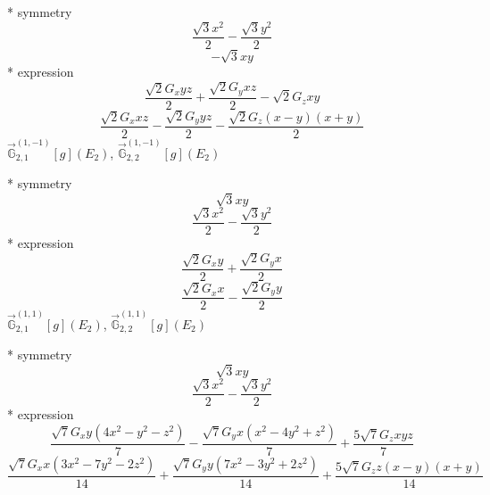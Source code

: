 \documentclass[fleqn,8pt]{jsarticle}
\begin{document}
\noindent\quad ** symmetry
\begin{dmath*}
\frac{\sqrt{3} x^{2}}{2} - \frac{\sqrt{3} y^{2}}{2}
\end{dmath*}
\begin{dmath*}
- \sqrt{3} x y
\end{dmath*}
\noindent\quad ** expression
\begin{dmath*}
\frac{\sqrt{2} G_{x} y z}{2} + \frac{\sqrt{2} G_{y} x z}{2} - \sqrt{2} G_{z} x y
\end{dmath*}
\begin{dmath*}
\frac{\sqrt{2} G_{x} x z}{2} - \frac{\sqrt{2} G_{y} y z}{2} - \frac{\sqrt{2} G_{z} \left(x - y\right) \left(x + y\right)}{2}
\end{dmath*}
\noindent\quad $\vec{\mathbb{G}}_{2,1}^{(1,-1)}[g](E_{2})$, $\vec{\mathbb{G}}_{2,2}^{(1,-1)}[g](E_{2})$

\noindent\quad ** symmetry
\begin{dmath*}
\sqrt{3} x y
\end{dmath*}
\begin{dmath*}
\frac{\sqrt{3} x^{2}}{2} - \frac{\sqrt{3} y^{2}}{2}
\end{dmath*}
\noindent\quad ** expression
\begin{dmath*}
\frac{\sqrt{2} G_{x} y}{2} + \frac{\sqrt{2} G_{y} x}{2}
\end{dmath*}
\begin{dmath*}
\frac{\sqrt{2} G_{x} x}{2} - \frac{\sqrt{2} G_{y} y}{2}
\end{dmath*}
\noindent\quad $\vec{\mathbb{G}}_{2,1}^{(1,1)}[g](E_{2})$, $\vec{\mathbb{G}}_{2,2}^{(1,1)}[g](E_{2})$

\noindent\quad ** symmetry
\begin{dmath*}
\sqrt{3} x y
\end{dmath*}
\begin{dmath*}
\frac{\sqrt{3} x^{2}}{2} - \frac{\sqrt{3} y^{2}}{2}
\end{dmath*}
\noindent\quad ** expression
\begin{dmath*}
\frac{\sqrt{7} G_{x} y \left(4 x^{2} - y^{2} - z^{2}\right)}{7} - \frac{\sqrt{7} G_{y} x \left(x^{2} - 4 y^{2} + z^{2}\right)}{7} + \frac{5 \sqrt{7} G_{z} x y z}{7}
\end{dmath*}
\begin{dmath*}
\frac{\sqrt{7} G_{x} x \left(3 x^{2} - 7 y^{2} - 2 z^{2}\right)}{14} + \frac{\sqrt{7} G_{y} y \left(7 x^{2} - 3 y^{2} + 2 z^{2}\right)}{14} + \frac{5 \sqrt{7} G_{z} z \left(x - y\right) \left(x + y\right)}{14}
\end{dmath*}
\end{document}
